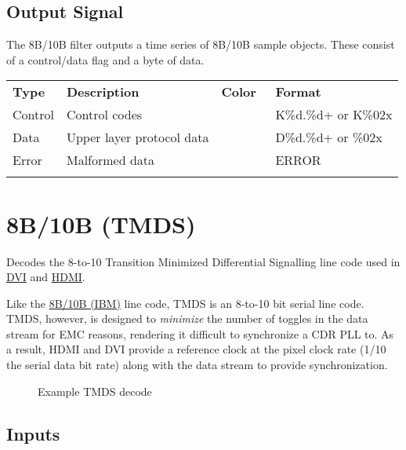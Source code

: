 \subsection{Output Signal}

The 8B/10B filter outputs a time series of 8B/10B sample objects. These consist of a control/data flag and a byte of
data.

\begin{tabularx}{16cm}{lllX}
\thickhline
\textbf{Type} & \textbf{Description} & \textbf{Color} & \textbf{Format} \\
\thickhline
Control & Control codes & \cellcolor{control}\textcolor{white}{Control} & K\%d.\%d+ or K\%02x\\
\thinhline
Data & Upper layer protocol data & \cellcolor{data}\textcolor{white}{Data} & D\%d.\%d+ or \%02x\\
\thinhline
Error & Malformed data & \cellcolor{error}\textcolor{white}{Error} & ERROR \\
\thickhline
\end{tabularx}

\pagebreak
\section{8B/10B (TMDS)}
\label{filter:tmds}

Decodes the 8-to-10 Transition Minimized Differential Signalling line code used in \hyperref[filter:dvi]{DVI} and
\hyperref[filter:hdmi]{HDMI}.

Like the \hyperref[filter:8b10b]{8B/10B (IBM)} line code, TMDS is an 8-to-10 bit serial line code. TMDS, however, is
designed to \emph{minimize} the number of toggles in the data stream for EMC reasons, rendering it difficult to
synchronize a CDR PLL to. As a result, HDMI and DVI provide a reference clock at the pixel clock rate (1/10 the serial
data bit rate) along with the data stream to provide synchronization.

\begin{figure}[h]
\centering
{}
\caption{Example TMDS decode}
\label{filter_tmds}
\end{figure}

\subsection{Inputs}


